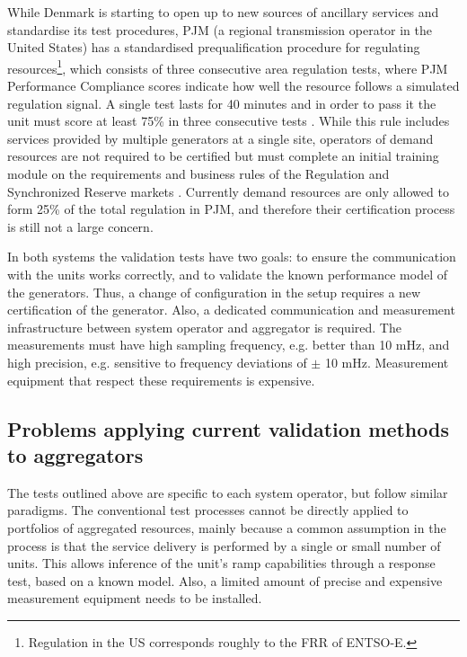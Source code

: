 While Denmark is starting to open up to new sources of ancillary services and standardise its test procedures, PJM (a regional transmission operator in the United States) has a standardised prequalification procedure for regulating resources\footnote{Regulation in the US corresponds roughly to the FRR of ENTSO-E.}, which consists of three consecutive area regulation tests, where PJM Performance Compliance scores indicate how well the resource follows a simulated regulation signal. A single test lasts for 40 minutes and in order to pass it the unit must score at least 75\% in three consecutive tests  \cite{pjm2015balance}. While this rule includes services provided by multiple generators at a single site, operators of demand resources are not required to be certified but must complete an initial training module on the requirements and business rules of the Regulation and Synchronized Reserve markets \cite{pjm2015certification}. Currently demand resources are only allowed to form 25\% of the total regulation \cite{pjm2015ancillary} in PJM, and therefore their certification process is still not a large concern. 

In both systems the validation tests have two goals: to ensure the communication with the units works correctly, and to validate the known performance model of the generators. Thus, a change of configuration in the setup requires a new certification of the generator. Also, a dedicated communication and measurement infrastructure between system operator and aggregator is required. The measurements must have high sampling frequency, e.g. better than 10 mHz, and high precision, e.g. sensitive to frequency deviations of $\pm$ 10 mHz. Measurement equipment that respect these requirements is expensive.
\subsection{Problems applying current validation methods to aggregators}
The tests outlined above are specific to each system operator, but follow similar paradigms. 
The conventional test processes cannot be directly applied to portfolios of aggregated resources, mainly because a common assumption in the process is that the service delivery is performed by a single or small number of units. This allows inference of the unit's ramp capabilities through a response test, based on a known model. Also, a limited amount of precise and expensive measurement equipment needs to be installed.

